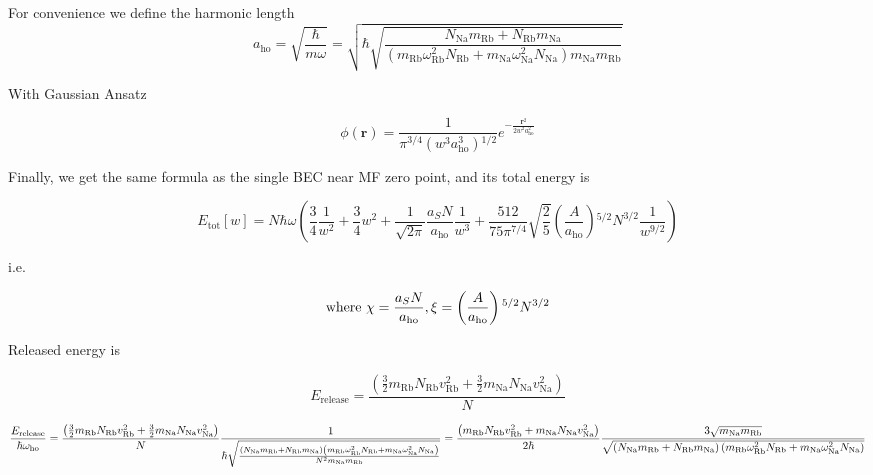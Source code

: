 For convenience we define the harmonic length
\begin{equation}
a_{\text{ho}}=\sqrt{\frac{\hbar }{m \omega }}=\sqrt{\hbar \sqrt{\frac{N_{\text{Na}}m_{\text{Rb}}+N_{\text{Rb}}m_{\text{Na}}}{\left(m_{\text{Rb}}
\omega _{\text{Rb}}^2N_{\text{Rb}}+m_{\text{Na}} \omega _{\text{Na}}^2N_{\text{Na}}\right)m_{\text{Na}}m_{\text{Rb}}}}}
\end{equation}

With Gaussian Ansatz

\begin{equation}\phi (\pmb{r})=\frac{1}{\pi ^{3/4}\left(w^3a_{\text{ho}}^3\right){}^{1/2}}e^{-\frac{\pmb{r}^2}{2w^2a_{\text{ho}}^2}}\end{equation}

Finally, we get the same formula as the single BEC near MF zero point, and its total energy is

\begin{equation}E_{\text{tot}}[w]=N \hbar  \omega  \left(\frac{3}{4}\frac{1}{w^2}+\frac{3}{4}w^2+\frac{1}{\sqrt{2\pi }}\frac{a_SN}{a_{\text{ho}}}\frac{1}{w^3}+\frac{512
}{75 \pi ^{7/4}}\sqrt{\frac{2}{5}}\left(\frac{A}{a_{\text{ho}}}\right){}^{5/2}N^{3/2}\frac{1}{ w^{9/2}}\right)\end{equation}

i.e.

\begin{equation}\text{}\\
\text{where}\text{    }\chi =\frac{a_SN}{a_{\text{ho}}}, \xi =\left(\frac{A}{a_{\text{ho}}}\right){}^{5/2}N^{3/2}\end{equation}

Released energy is

\begin{equation}E_{\text{release}}=\frac{\left(\frac{3}{2}m_{\text{Rb}}N_{\text{Rb}}v_{\text{Rb}}^2+\frac{3}{2}m_{\text{Na}}N_{\text{Na}}v_{\text{Na}}^2\right)}{N}\end{equation}

\begin{equation}\frac{E_{\text{release}}}{\hbar  \omega _{\text{ho}}}=\\
\frac{\left(\frac{3}{2}m_{\text{Rb}}N_{\text{Rb}}v_{\text{Rb}}^2+\frac{3}{2}m_{\text{Na}}N_{\text{Na}}v_{\text{Na}}^2\right)}{N}\frac{1}{\hbar \sqrt{\frac{\left(N_{\text{Na}}m_{\text{Rb}}+N_{\text{Rb}}m_{\text{Na}}\right)\left(m_{\text{Rb}}
\omega _{\text{Rb}}^2N_{\text{Rb}}+m_{\text{Na}} \omega _{\text{Na}}^2N_{\text{Na}}\right)}{N^2m_{\text{Na}}m_{\text{Rb}}}}}=\frac{\left(m_{\text{Rb}}N_{\text{Rb}}v_{\text{Rb}}^2+m_{\text{Na}}N_{\text{Na}}v_{\text{Na}}^2\right)}{2\hbar
}\frac{3\sqrt{m_{\text{Na}}m_{\text{Rb}}}}{\sqrt{\left(N_{\text{Na}}m_{\text{Rb}}+N_{\text{Rb}}m_{\text{Na}}\right)\left(m_{\text{Rb}} \omega _{\text{Rb}}^2N_{\text{Rb}}+m_{\text{Na}}
\omega _{\text{Na}}^2N_{\text{Na}}\right)}}\end{equation}

